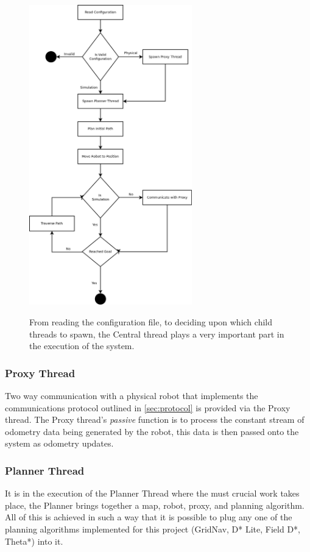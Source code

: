 \begin{figure}[htbp]

\center \includegraphics[width=200pt]{illustrations/thread_flow.png}\\
\caption{From reading the configuration file, to deciding upon which child threads to spawn, the Central thread plays a very important part in the execution of the system.} 
\label{central thread}

\end{figure}

\subsubsection*{Proxy Thread}
\noindent
Two way communication with a physical robot that implements the communications protocol outlined in \ref{sec:protocol} is provided via the Proxy thread. The Proxy thread's \textit{passive} function is to process the constant stream of odometry data being generated by the robot, this data is then passed onto the system as odometry updates. 

\subsubsection*{Planner Thread}\label{planner thread}
\noindent
It is in the execution of the Planner Thread where the must crucial work takes place, the Planner brings together a map, robot, proxy, and planning algorithm. All of this is achieved in such a way that it is possible to plug any one of the planning algorithms implemented for this project (GridNav, D* Lite, Field D*, Theta*) into it. \\

